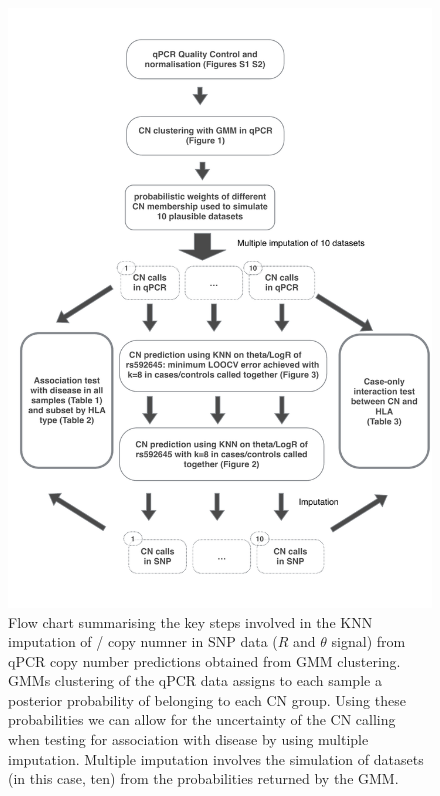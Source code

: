 \begin{figure}[h]
    \centering
        \includegraphics[scale=.5] {KIR/figures/method-flowchart.pdf}
{Flow chart summarising the key steps involved in the KNN imputation of / copy numner in SNP data
($R$ and $\theta$ signal) from qPCR copy number predictions obtained from GMM clustering.}
{
\Glspl{GMM} clustering of the qPCR data assigns to each sample a posterior probability of belonging to each \gls{CN} group.
Using these probabilities we can allow for the uncertainty of the CN calling when testing for association with disease by using multiple imputation.
Multiple imputation involves the simulation of datasets (in this case, ten) from the probabilities returned by the GMM.
}
\end{figure}
